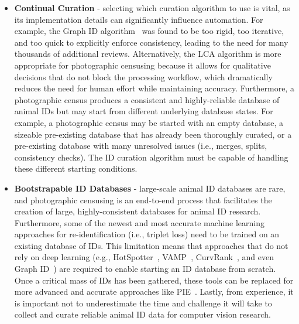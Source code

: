 \begin{itemize}
    \item \textbf{Continual Curation} - selecting which curation algorithm to use is vital, as its implementation details can significantly influence automation. For example, the Graph ID algorithm~\cite{crall_identifying_2017} was found to be too rigid, too iterative, and too quick to explicitly enforce consistency, leading to the need for many thousands of additional reviews.  Alternatively, the LCA algorithm is more appropriate for photographic censusing because it allows for qualitative decisions that do not block the processing workflow, which dramatically reduces the need for human effort while maintaining accuracy.  Furthermore, a photographic census produces a consistent and highly-reliable database of animal IDs but may start from different underlying database states.  For example, a photographic census may be started with an empty database, a sizeable pre-existing database that has already been thoroughly curated, or a pre-existing database with many unresolved issues (i.e., merges, splits, consistency checks).  The ID curation algorithm must be capable of handling these different starting conditions.
    \item \textbf{Bootstrapable ID Databases} - large-scale animal ID databases are rare, and photographic censusing is an end-to-end process that facilitates the creation of large, highly-consistent databases for animal ID research.  Furthermore, some of the newest and most accurate machine learning approaches for re-identification (i.e., triplet loss) need to be trained on an existing database of IDs.  This limitation means that approaches that do not rely on deep learning (e.g., HotSpotter~\cite{crall_hotspotter_2013}, VAMP~\cite{crall_identifying_2017}, CurvRank~\cite{weideman_integral_2017}, and even Graph ID~\cite{crall_identifying_2017}) are required to enable starting an ID database from scratch.  Once a critical mass of IDs has been gathered, these tools can be replaced for more advanced and accurate approaches like PIE~\cite{moskvyak_robust_2019}.  Lastly, from experience, it is important not to underestimate the time and challenge it will take to collect and curate reliable animal ID data for computer vision research.

\end{itemize}
